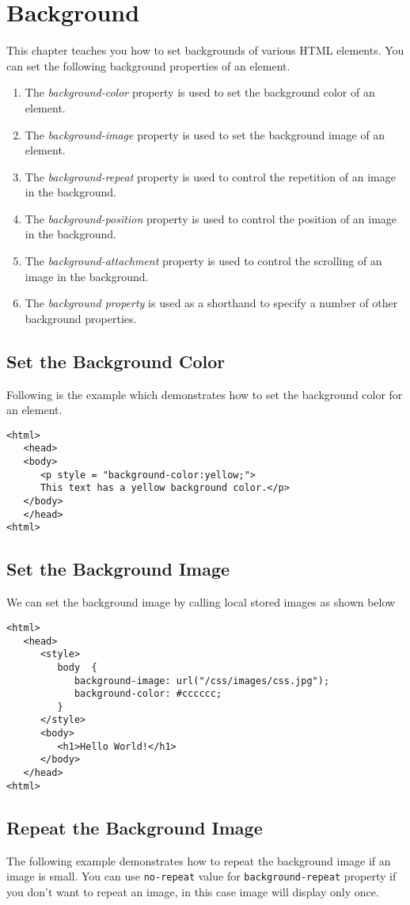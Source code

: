 \documentclass[a4paper,oneside]{book}
\numberwithin{equation}{chapter}
\begin{document}
\section{Background}
This chapter teaches you how to set backgrounds of various HTML elements. You can set the following background properties of an element.
\begin{enumerate}
\item The \textit{background-color} property is used to set the background color of an element.
\item The \textit{background-image} property is used to set the background image of an element.
\item The \textit{background-repeat} property is used to control the repetition of an image in the background.
\item The \textit{background-position} property is used to control the position of an image in the background.
\item The \textit{background-attachment} property is used to control the scrolling of an image in the background.
\item The \textit{background property} is used as a shorthand to specify a number of other background properties.
\end{enumerate}
\subsection{Set the Background Color}
Following is the example which demonstrates how to set the background color for an element.
\begin{verbatim}
<html>
   <head>
   <body>
      <p style = "background-color:yellow;">
      This text has a yellow background color.</p>
   </body>
   </head>
<html>
\end{verbatim}
\subsection{Set the Background Image}
We can set the background image by calling local stored images as shown below
\begin{verbatim}
<html>
   <head>
      <style>
         body  {
            background-image: url("/css/images/css.jpg");
            background-color: #cccccc;
         }
      </style>
      <body>
         <h1>Hello World!</h1>
      </body>
   </head>
<html>
\end{verbatim}
\subsection{Repeat the Background Image}
The following example demonstrates how to repeat the background image if an image is small. You can use \texttt{no-repeat} value for \texttt{background-repeat} property if you don't want to repeat an image, in this case image will display only once.
\end{document}
